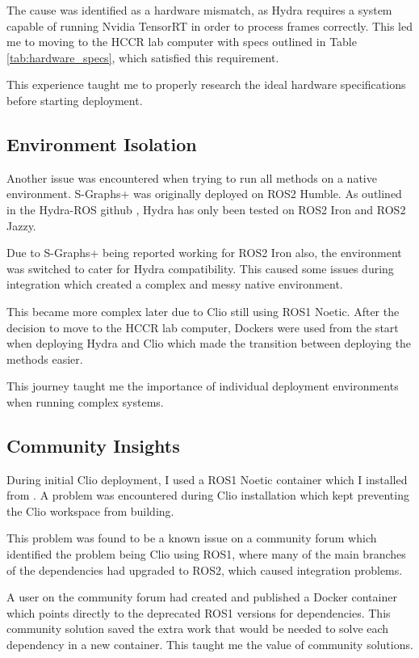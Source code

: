 The cause was identified as a hardware mismatch, as Hydra requires a system capable of running Nvidia TensorRT in order to process frames correctly. This led me to moving to the HCCR lab computer with specs outlined in Table \ref{tab:hardware_specs}, which satisfied this requirement. 

This experience taught me to properly research the ideal hardware specifications before starting deployment.

\subsection{Environment Isolation}\label{sec:ref:environment-isolation}

Another issue was encountered when trying to run all methods on a native environment. S-Graphs+ was originally deployed on ROS2 Humble. As outlined in the Hydra-ROS github \cite{hydra-ros-repo}, Hydra has only been tested on ROS2 Iron and ROS2 Jazzy. 

Due to S-Graphs+ being reported working for ROS2 Iron also, the environment was switched to cater for Hydra compatibility. This caused some issues during integration which created a complex and messy native environment. 

This became more complex later due to Clio still using ROS1 Noetic. After the decision to move to the HCCR lab computer, Dockers were used from the start when deploying Hydra and Clio which made the transition between deploying the methods easier. 

This journey taught me the importance of individual deployment environments when running complex systems.

\subsection{Community Insights}\label{sec:ref:community-insights}

During initial Clio deployment, I used a ROS1 Noetic container which I installed from \cite{shakeri2023docker}. A problem was encountered during Clio installation which kept preventing the Clio workspace from building. 

This problem was found to be a known issue on a community forum which identified the problem being Clio using ROS1, where many of the main branches of the dependencies had upgraded to ROS2, which caused integration problems. 

A user on the community forum had created and published a Docker container which points directly to the deprecated ROS1 versions for dependencies. This community solution saved the extra work that would be needed to solve each dependency in a new container. This taught me the value of community solutions.



